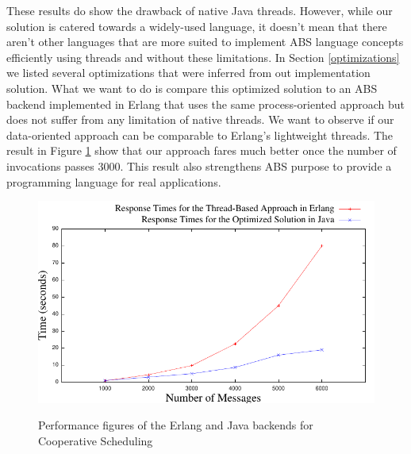 \par These results do show the drawback of native Java threads. However, while our solution is catered towards a widely-used language, it doesn't mean that there aren't other languages that are more suited to implement ABS language concepts efficiently using threads and without these limitations. In Section \ref{optimizations} we listed several optimizations that were inferred from out implementation solution. What we want to do is compare this optimized solution to an ABS backend implemented in Erlang that uses the same process-oriented approach but does not suffer from any limitation of native threads. We want to observe if our data-oriented approach can be comparable to Erlang's lightweight threads. The result in Figure \ref{ej} show that our approach fares much better once the number of invocations passes 3000. This result also strengthens ABS purpose to provide a programming language for real applications.

\begin{figure}
	\caption{Performance figures of the Erlang and Java backends for Cooperative Scheduling}
	\centering
	\includegraphics[scale=0.8]{erlj8.pdf}
	\label{ej}
	
\end{figure}



